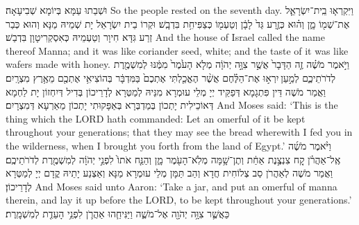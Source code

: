 {{וּשְׁבַתוּ עַמָּא בְּיוֹמָא שְׁבִיעָאָה׃}
{So the people rested on the seventh day.}{}
{וַיִּקְרְא֧וּ בֵֽית־יִשְׂרָאֵ֛ל אֶת־שְׁמ֖וֹ מָ֑ן וְה֗וּא כְּזֶ֤רַע גַּד֙ לָבָ֔ן וְטַעְמ֖וֹ כְּצַפִּיחִ֥ת בִּדְבָֽשׁ׃
}
{וּקְרוֹ בֵית יִשְׂרָאֵל יָת שְׁמֵיהּ מַנָּא וְהוּא כְּבַר זְרַע גִּדָּא חִיוָר וְטַעְמֵיהּ כְּאִסְקְרִיטָוָן בִּדְבַשׁ׃}
{And the house of Israel called the name thereof Manna; and it was like coriander seed, white; and the taste of it was like wafers made with honey.}{}
{וַיֹּ֣אמֶר מֹשֶׁ֗ה זֶ֤ה הַדָּבָר֙ אֲשֶׁ֣ר צִוָּ֣ה יְהֹוָ֔ה מְלֹ֤א הָעֹ֙מֶר֙ מִמֶּ֔נּוּ לְמִשְׁמֶ֖רֶת לְדֹרֹתֵיכֶ֑ם לְמַ֣עַן \legarmeh  יִרְא֣וּ אֶת־הַלֶּ֗חֶם אֲשֶׁ֨ר הֶאֱכַ֤לְתִּי אֶתְכֶם֙ בַּמִּדְבָּ֔ר בְּהוֹצִיאִ֥י אֶתְכֶ֖ם מֵאֶ֥רֶץ מִצְרָֽיִם׃
}
{וַאֲמַר מֹשֶׁה דֵּין פִּתְגָמָא דְּפַקֵּיד יְיָ מְלֵי עוּמְרָא מִנֵּיהּ לְמַטְּרָא לְדָרֵיכוֹן בְּדִיל דְּיִחְזוֹן יָת לַחְמָא דְּאוֹכֵילִית יָתְכוֹן בְּמַדְבְּרָא בְּאַפָּקוּתִי יָתְכוֹן מֵאַרְעָא דְּמִצְרָיִם׃}
{And Moses said: ‘This is the thing which the LORD hath commanded: Let an omerful of it be kept throughout your generations; that they may see the bread wherewith I fed you in the wilderness, when I brought you forth from the land of Egypt.’}{}
{וַיֹּ֨אמֶר מֹשֶׁ֜ה אֶֽל־אַהֲרֹ֗ן קַ֚ח צִנְצֶ֣נֶת אַחַ֔ת וְתֶן־שָׁ֥מָּה מְלֹֽא־הָעֹ֖מֶר מָ֑ן וְהַנַּ֤ח אֹתוֹ֙ לִפְנֵ֣י יְהֹוָ֔ה לְמִשְׁמֶ֖רֶת לְדֹרֹתֵיכֶֽם׃
}
{וַאֲמַר מֹשֶׁה לְאַהֲרֹן סַב צְלוֹחִית חֲדָא וְהַב תַּמָּן מְלֵי עוּמְרָא מַנָּא וְאַצְנַע יָתֵיהּ קֳדָם יְיָ לְמַטְּרָא לְדָרֵיכוֹן׃}
{And Moses said unto Aaron: ‘Take a jar, and put an omerful of manna therein, and lay it up before the LORD, to be kept throughout your generations.’}{}
{כַּאֲשֶׁ֛ר צִוָּ֥ה יְהֹוָ֖ה אֶל־מֹשֶׁ֑ה וַיַּנִּיחֵ֧הוּ אַהֲרֹ֛ן לִפְנֵ֥י הָעֵדֻ֖ת לְמִשְׁמָֽרֶת׃}
}
